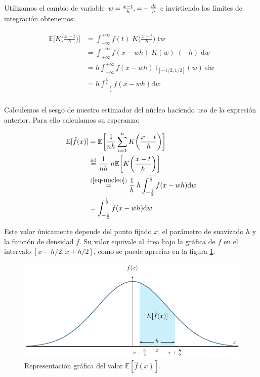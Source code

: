 \documentclass[a4paper]{article}
\newcommand{\E}{\mathbb{E}}
\newcommand{\I}{\mathbb{I}}
\begin{document}
Utilizamos el cambio de variable $w = \frac{x-t}{h}, \text = -\frac{dt}{h}$ e invirtiendo los límites de integración obtenemos:

\begin{align}
	\label{eq-nucleo}
	\begin{split}
		\E \bigg[ K\bigg(\frac{x - t}{h}\bigg) \bigg] & = \int_{-\infty}^{+\infty} f(t) \; K\bigg(\frac{x - t}{h}\bigg) \; \text{t}w \\
		& = \int_{+\infty}^{-\infty} f(x - wh) \; K(w) \; (-h) \; \text{d}w \\
		& = h \int_{-\infty}^{+\infty} f(x - wh) \; \I_{[-1/2,1/2]}(w) \; \text{d}w \\
		& = h \int_{-\frac{1}{2}}^{\frac{1}{2}} f(x - wh) \text{d}w \\
	\end{split}
\end{align}

Calculemos el sesgo de nuestro estimador del núcleo haciendo uso de la expresión anterior. Para ello calculamos su esperanza:

\begin{align*}
	\E [ \hat f(x)] & = \E \bigg[ \frac{1}{nh} \sum_{i=1}^n K\bigg(\frac{x - t}{h}\bigg) \bigg] \\
	& \stackrel{\text{iid}}{=} \frac{1}{nh} \; n \E \bigg[ K\bigg(\frac{x - t}{h}\bigg) \bigg] \\
	& \stackrel{(\ref{eq-nucleo})}{=} \frac{1}{h} \; h \int_{-\frac{1}{2}}^{\frac{1}{2}} f(x - wh) \text{d}w \\
	& = \int_{-\frac{1}{2}}^{\frac{1}{2}} f(x - wh) \text{d}w \\
\end{align*}

Este valor únicamente depende del punto fijado $x$, el parámetro de suavizado $h$ y la función de densidad $f$. Su valor equivale al área bajo la gráfica de $f$ en el intervalo $[x - h/2, x + h/2]$, como se puede apreciar en la figura \ref{fig-sesgo}. \\

\begin{figure}[H]
	\centering
	\includegraphics[width=17cm]{figures/sesgo}
	\caption{Representación gráfica del valor $\E [\hat f(x)]$.}
	\label{fig-sesgo}
\end{figure}
\end{document}
